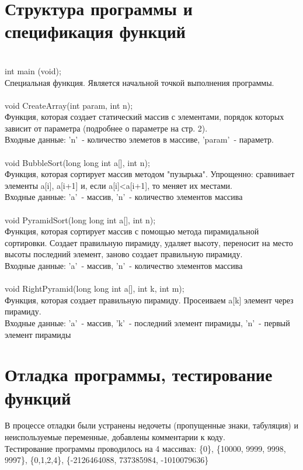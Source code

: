\documentclass[a4paper,12pt,titlepage,finall]{article}
\begin{document}
\newpage

\section{Структура программы и спецификация функций}

~\\
int main (void);\\
Специальная функция. Является начальной точкой выполнения программы.\\
~\\
void CreateArray(int param, int n);\\
Функция, которая создает статический массив с элементами, порядок которых зависит от параметра (подробнее о параметре на стр. 2).\\
Входные данные: 'n'\ - количество элеметов в массиве, 'param'\ - параметр.\\
~\\
void BubbleSort(long long int a[], int n);\\
Функция, которая сортирует массив методом "пузырька". Упрощенно: сравнивает элементы a[i], a[i+1] и, если a[i]<a[i+1], то меняет их местами.\\
Входные данные: 'a'\ - массив, 'n'\ - количество элементов массива\\
~\\
void PyramidSort(long long int a[], int n);\\
Функция, которая сортирует массив с помощью метода пирамидальной сортировки. Создает правильную пирамиду, удаляет высоту, переносит на место высоты последний элемент, заново создает правильную пирамиду.\\
Входные данные: 'a'\ - массив, 'n'\ - количество элементов массива\\
~\\
void RightPyramid(long long int a[], int k, int m);\\
Функция, которая создает правильную пирамиду. Просеиваем a[k] элемент через пирамиду.\\
Входные данные: 'a'\ - массив, 'k'\ - последний элемент пирамиды, 'n'\ - первый элемент пирамиды\\

\newpage

\section{Отладка программы, тестирование функций}

В процессе отладки были устранены недочеты (пропущенные знаки, табуляция) и неиспользуемые переменные, добавлены комментарии к коду.\\
Тестирование программы проводилось на 4 массивах: \{0\}, \{10000, 9999, 9998, 9997\}, \{0,1,2,4\}, \{-2126464088, 737385984, -1010079636\} \\
\end{document}

